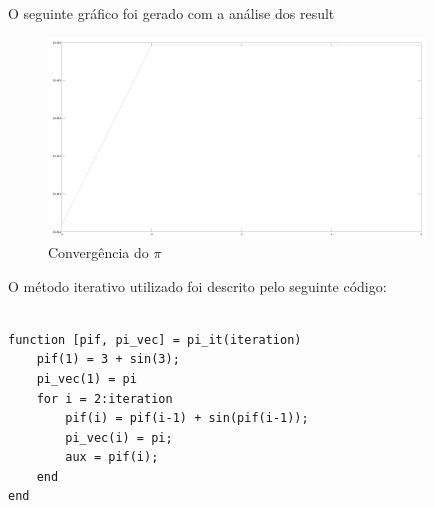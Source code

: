 \documentclass[a4paper]{article}
\begin{document}
O seguinte gráfico foi gerado com a análise dos result

\begin{figure}[H]
    \centering
    \includegraphics[width=100mm]{pi_magic.png}
    \caption{Convergência do $\pi$}
    \label{pi_magic}
\end{figure}

O método iterativo utilizado foi descrito pelo seguinte código:

\begin{lstlisting}

function [pif, pi_vec] = pi_it(iteration)
	pif(1) = 3 + sin(3);
	pi_vec(1) = pi
	for i = 2:iteration
		pif(i) = pif(i-1) + sin(pif(i-1));
		pi_vec(i) = pi;
		aux = pif(i);
	end
end

\end{lstlisting}






\end{document}

